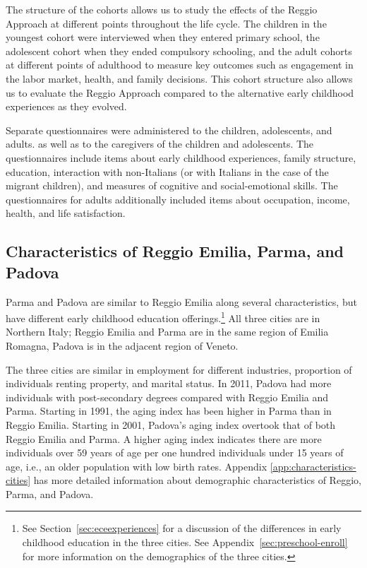 The structure of the cohorts allows us to study the effects of the Reggio Approach at different points throughout the life cycle. The children in the youngest cohort were interviewed when they entered primary school, the adolescent cohort when they ended compulsory schooling, and the adult cohorts at different points of adulthood to measure key outcomes such as engagement in the labor market, health, and family decisions. This cohort structure also allows us to evaluate the Reggio Approach compared to the alternative early childhood experiences as they evolved.

Separate questionnaires were administered to the children, adolescents, and adults. as well as to the caregivers of the children and adolescents. The questionnaires include items about early childhood experiences, family structure, education, interaction with non-Italians (or with Italians in the case of the migrant children), and measures of cognitive and social-emotional skills. The questionnaires for adults additionally included items about occupation, income, health, and life satisfaction. 

\subsection{Characteristics of Reggio Emilia, Parma, and Padova}

Parma and Padova are similar to Reggio Emilia along several characteristics, but have different early childhood education offerings.\footnote{See Section~\ref{sec:eceexperiences} for a discussion of the differences in early childhood education in the three cities. See Appendix~\ref{sec:preschool-enroll} for more information on the demographics of the three cities.} All three cities are in Northern Italy; Reggio Emilia and Parma are in the same region of Emilia Romagna, Padova is in the adjacent region of Veneto. 

The three cities are similar in employment for different industries, proportion of individuals renting property, and marital status. In 2011, Padova had more individuals with post-secondary degrees compared with Reggio Emilia and Parma. Starting in 1991, the aging index has been higher in Parma than in Reggio Emilia. Starting in 2001, Padova's aging index overtook that of both Reggio Emilia and Parma. A higher aging index indicates there are more individuals over 59 years of age per one hundred individuals under 15 years of age, i.e., an older population with low birth rates. Appendix \ref{app:characteristics-cities} has more detailed information about demographic characteristics of Reggio, Parma, and Padova. 

